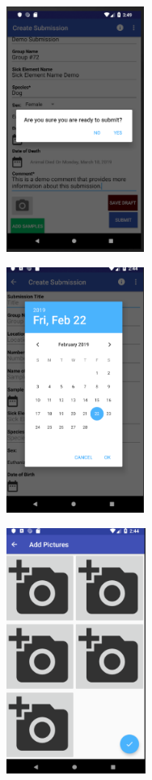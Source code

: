 \documentclass[onecolumn, draftclsnofoot,10pt, compsoc]{IEEEtran}
\begin{document}
\begin{center}
\includegraphics[height=8cm]{Beta_create_sub_3.png}
\end{center}


\begin{center}
\includegraphics[height=8cm]{datePickerFragment.png}
\end{center}

\begin{center}
\includegraphics[height=8cm]{add_pictures.png}
\end{center}
\end{document}
